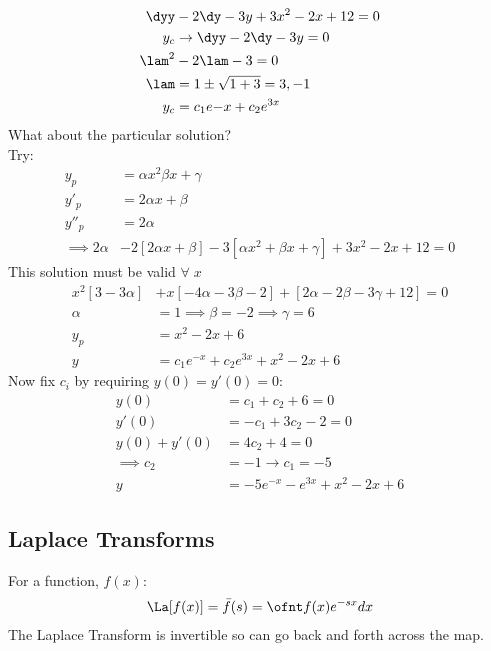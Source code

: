 \documentclass[Maths.tex]{subfiles}
\begin{document}
\chapter{}
\begin{example}
\begin{align}
    \dyy &- 2\dy - 3y + 3x^2 - 2x + 12 = 0 \\
    y_c &\to \dyy -2\dy -3y = 0 \\
    \lam^2 &- 2\lam - 3 = 0 \\
    \lam &= 1 \pm \sqrt{1 + 3} = 3,-1 \\
    y_c &= c_1e{-x} + c_2e^{3x}
\end{align}
What about the particular solution? \\
Try:
\begin{align}
    y_p &= \alpha x^2 \beta x + \gamma \\
    y'_p &= 2\alpha x + \beta \\
    y''_p &= 2\alpha \\
    \implies 2\alpha & -2[2\alpha x + \beta] - 3[\alpha x^2 + \beta x + \gamma] + 3x^2 - 2x + 12 = 0
\end{align}
This solution must be valid $\forall\; x$
\begin{align}
    x^2[3 - 3\alpha] &+ x[-4\alpha - 3\beta - 2] + [2\alpha -2\beta -3\gamma + 12] =  0 \\
    \alpha &= 1 \implies \beta = -2 \implies \gamma = 6 \\
    y_p &= x^2 - 2x + 6 \\
    y &= c_1e^{-x} + c_2e^{3x} + x^2 - 2x + 6
\end{align}
Now fix $c_i$ by requiring $y(0) = y'(0) = 0$:
\begin{align}
    y(0) &= c_1 + c_2 + 6 = 0 \\
    y'(0) &= -c_1 + 3c_2 - 2 = 0 \\
    y(0) + y'(0) &= 4c_2 + 4 = 0 \\
    \implies c_2 &= -1 \to c_1 = -5 \\
    y &= -5e^{-x} - e^{3x} + x^2 -2x + 6
\end{align}
\end{example}

\section{Laplace Transforms}
For a function, $f(x)$:
\begin{align}
    \La[f(x)] = \bar{f}(s) = \ofnt f(x) e^{-sx}dx
\end{align}
The Laplace Transform is invertible so can go back and forth across the map.
\end{document}
